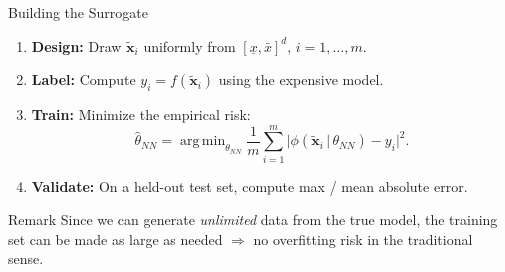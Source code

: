 \documentclass[aspectratio=169,11pt]{beamer}
\newcommand{\emphc}[1]{\textcolor{harvardcrimson}{#1}}
\newcommand{\x}{\bm{x}}
\DeclareMathOperator*{\argmin}{arg\,min}
\begin{document}
\begin{frame}{Building the Surrogate}
\begin{enumerate}
  \item \textbf{Design:} Draw $\tilde{\x}_i$ uniformly from $[\underline{x},\bar{x}]^d$, \quad $i = 1,\dots,m$.
  \item \textbf{Label:} Compute $y_i = f(\tilde{\x}_i)$ using the expensive model.
  \item \textbf{Train:} Minimize the empirical risk:
  \[
  \hat{\theta}_{NN} = \argmin_{\theta_{NN}} \frac{1}{m}\sum_{i=1}^{m}
  \bigl|\phi(\tilde{\x}_i\,|\,\theta_{NN}) - y_i\bigr|^2.
  \]
  \item \textbf{Validate:} On a held-out test set, compute max / mean absolute error.
\end{enumerate}

\vspace{0.4cm}
\begin{block}{Remark}
Since we can generate \emph{unlimited} data from the true model, the training set can be made as large as needed $\Rightarrow$ \emphc{no overfitting risk} in the traditional sense.
\end{block}
\end{frame}
\end{document}
